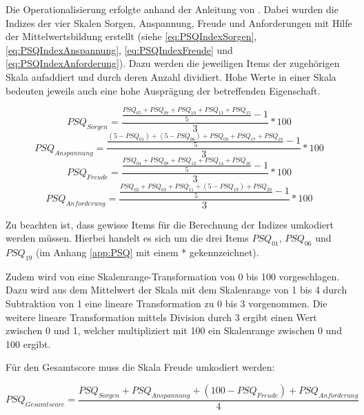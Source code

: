 Die Operationalisierung erfolgte anhand der Anleitung von . Dabei wurden die Indizes der vier Skalen Sorgen, Anspannung, Freude und Anforderungen mit Hilfe der Mittelwertsbildung erstellt (siehe \ref{eq:PSQIndexSorgen}, \ref{eq:PSQIndexAnspannung}, \ref{eq:PSQIndexFreude} und \ref{eq:PSQIndexAnforderung}). Dazu werden die jeweiligen Items der zugehörigen Skala aufaddiert und durch deren Anzahl dividiert. Hohe Werte in einer Skala bedeuten jeweils auch eine hohe Ausprägung der betreffenden Eigenschaft.

\begin{equation}\label{eq:PSQIndexSorgen}
    PSQ_{Sorgen}=\frac{\frac{PSQ_{05}+PSQ_{07}+PSQ_{10}+PSQ_{13}+PSQ_{15}}{5}-1}{3}*100
\end{equation}
\begin{equation}\label{eq:PSQIndexAnspannung}
    PSQ_{Anspannung}=\frac{\frac{(5-PSQ_{01})+(5-PSQ_{06})+PSQ_{09}+PSQ_{17}+PSQ_{18}}{5}-1}{3}*100
\end{equation}
\begin{equation}\label{eq:PSQIndexFreude}
    PSQ_{Freude}=\frac{\frac{PSQ_{04}+PSQ_{08}+PSQ_{12}+PSQ_{14}+PSQ_{16}}{5}-1}{3}*100
\end{equation}
\begin{equation}\label{eq:PSQIndexAnforderung}
    PSQ_{Anforderung}=\frac{\frac{PSQ_{02}+PSQ_{03}+PSQ_{11}+(5-PSQ_{19})+PSQ_{20}}{5}-1}{3}*100
\end{equation}

Zu beachten ist, dass gewisse Items für die Berechnung der Indizes umkodiert werden müssen. Hierbei handelt es sich um die drei Items $PSQ_{01}$, $PSQ_{06}$ und $PSQ_{19}$ (im Anhang \ref{app:PSQ} mit einem * gekennzeichnet).

Zudem wird von  eine Skalenrange-Transformation von 0 bis 100 vorgeschlagen. Dazu wird aus dem Mittelwert der Skala mit dem Skalenrange von 1 bis 4 durch Subtraktion von 1 eine lineare Transformation zu 0 bis 3 vorgenommen. Die weitere lineare Transformation mittels Division durch 3 ergibt einen Wert zwischen 0 und 1, welcher multipliziert mit 100 ein Skalenrange zwischen 0 und 100 ergibt.  

Für den Gesamtscore muss die Skala Freude umkodiert werden:

\begin{equation}\label{eq:PSQGesamtscore}
    PSQ_{Gesamtscore}=\frac{PSQ_{Sorgen}+PSQ_{Anspannung}+ (100-PSQ_{Freude})+PSQ_{Anforderung}}{4}
\end{equation}


